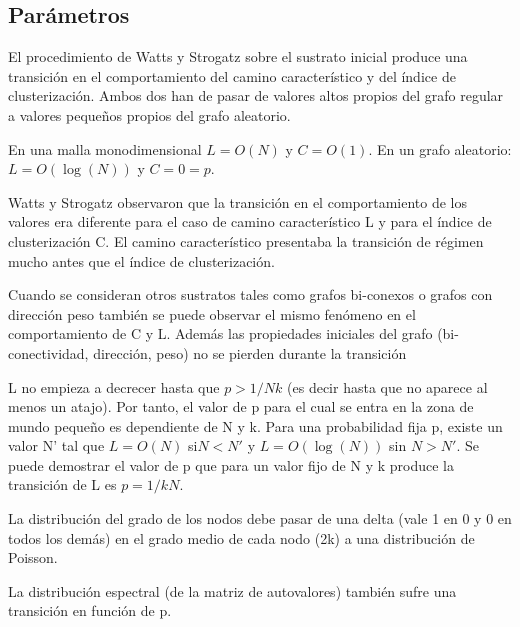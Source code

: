 \subsection{Parámetros}
El procedimiento de Watts y Strogatz sobre el sustrato inicial produce una transición en el comportamiento del camino característico y del índice de clusterización. Ambos dos han de pasar de valores altos propios del grafo regular a valores pequeños propios del grafo aleatorio.

En una malla monodimensional $L = O(N)$ y $C = O(1)$. En un grafo aleatorio: $L = O(\log(N))$ y $C = 0 = p$.

Watts y Strogatz observaron que la transición en el comportamiento de los valores era diferente para el
caso de camino característico L y para el índice de clusterización C. El camino característico presentaba la transición de régimen mucho antes que el índice de clusterización.

Cuando se consideran otros sustratos tales como grafos bi-conexos o grafos con dirección peso también se puede observar el mismo fenómeno en el comportamiento de C y L. Además las propiedades iniciales del grafo (bi-conectividad, dirección, peso) no se pierden durante la transición

L no empieza a decrecer hasta que $p > 1/Nk$ (es decir hasta que no aparece al menos un atajo). Por tanto, el valor de p para el cual se entra en la zona de mundo pequeño es dependiente de N y k. Para una probabilidad fija p, existe un valor N' tal que $L = O(N)$ si$ N < N'$ y $L=O(\log(N))$ sin $N > N'$. Se puede demostrar el valor de p que para un valor fijo de N y k produce la transición de L es $p = 1/kN$.

La distribución del grado de los nodos debe pasar de una delta (vale 1 en 0 y 0 en todos los demás) en el grado medio de cada nodo (2k) a una distribución de Poisson.

La distribución espectral (de la matriz de autovalores) también sufre una transición en función de p.